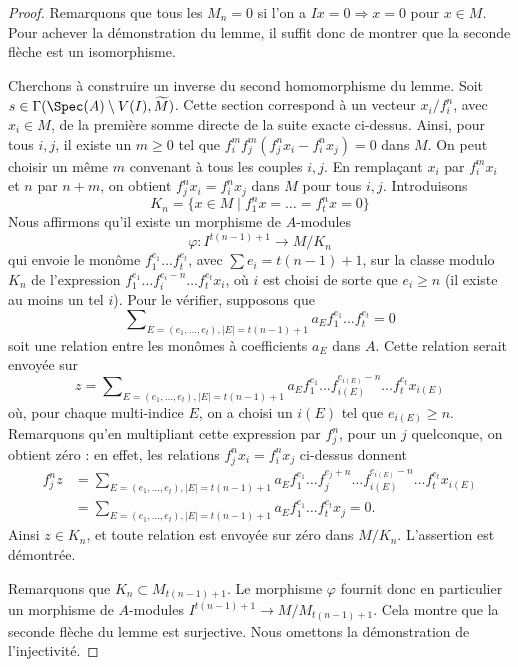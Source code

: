 \begin{proof}
\medskip\noindent
Remarquons que tous les $M_n = 0$ si l'on a
$Ix = 0 \Rightarrow x = 0$ pour $x \in M$. Pour
achever la démonstration du lemme, il suffit donc de montrer que
la seconde flèche est un isomorphisme.

\medskip\noindent
Cherchons à construire un inverse du second homomorphisme du lemme.
Soit $s \in \Gamma(\Spec(A) \setminus V(I), \widetilde{M})$.
Cette section correspond à un vecteur $x_i/f_i^n$, avec $x_i \in M$, de la
première somme directe de la suite exacte ci-dessus.
Ainsi, pour tous $i, j$, il existe un $m \geq 0$
tel que $f_i^m f_j^m (f_j^n x_i - f_i^n x_j) = 0$ dans $M$.
On peut choisir un même $m$ convenant à tous les couples $i, j$.
En remplaçant $x_i$ par $f_i^mx_i$ et $n$ par $n + m$,
on obtient $f_j^nx_i = f_i^nx_j$ dans $M$ pour tous $i, j$.
Introduisons
$$
K_n = \{x \in M \mid f_1^nx = \ldots = f_t^nx = 0\}
$$
Nous affirmons qu'il existe un morphisme de $A$-modules
$$
\varphi :
I^{t(n - 1) + 1}
\longrightarrow
M/K_n
$$
qui envoie le monôme
$f_1^{e_1} \ldots f_t^{e_t}$, avec $\sum e_i = t(n - 1) + 1$,
sur la classe modulo $K_n$ de l'expression
$f_1^{e_1} \ldots f_i^{e_i - n} \ldots f_t^{e_t}x_i$,
où $i$ est choisi de sorte que $e_i \geq n$ (il existe
au moins un tel $i$).
Pour le vérifier, supposons que
$$
\sum\nolimits_{E = (e_1, \ldots, e_t), |E| = t(n - 1) + 1}
a_E f_1^{e_1} \ldots f_t^{e_t} = 0
$$
soit une relation entre les monômes à coefficients $a_E$ dans $A$.
Cette relation serait envoyée sur
$$
z =
\sum\nolimits_{E = (e_1, \ldots, e_t), |E| = t(n - 1) + 1}
a_E f_1^{e_1} \ldots f_{i(E)}^{e_{i(E)} - n} \ldots f_t^{e_t}x_{i(E)}
$$
où, pour chaque multi-indice $E$, on a choisi un $i(E)$
tel que $e_{i(E)} \geq n$.
Remarquons qu'en multipliant cette expression par $f_j^n$, pour un $j$ quelconque,
on obtient zéro : en effet, les relations $f_j^nx_i = f_i^nx_j$ ci-dessus donnent
\begin{align*}
f_j^nz & = \sum\nolimits_{E = (e_1, \ldots, e_t), |E| = t(n - 1) + 1}
a_E f_1^{e_1} \ldots f_j^{e_j + n}
\ldots f_{i(E)}^{e_{i(E)} - n} \ldots f_t^{e_t}x_{i(E)} \\
& =
\sum\nolimits_{E = (e_1, \ldots, e_t), |E| = t(n - 1) + 1}
a_E f_1^{e_1} \ldots f_t^{e_t}x_j
= 0.
\end{align*}
Ainsi $z \in K_n$, et toute relation est envoyée sur zéro
dans $M/K_n$. L'assertion est démontrée.

\medskip\noindent
Remarquons que $K_n \subset M_{t(n - 1) + 1}$. Le
morphisme $\varphi$ fournit donc en particulier un morphisme de $A$-modules
$I^{t(n - 1) + 1} \to M/M_{t(n - 1) + 1}$.
Cela montre que la seconde flèche du lemme est surjective.
Nous omettons la démonstration de l'injectivité.
\end{proof}


